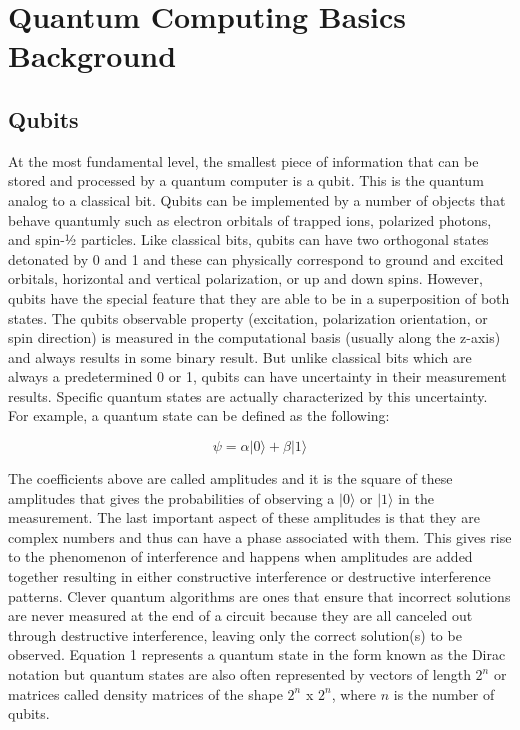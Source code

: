 \documentclass[
	a4paper, %
	10pt, %
	unnumberedsections, %
	twoside, %
]{LTJournalArticle}
\newcommand{\ket}[1]{\lvert#1\rangle} %
\begin{document}
\section{Quantum Computing Basics Background}

\subsection{Qubits}
At the most fundamental level, the smallest piece of information that can be stored and processed by a quantum computer is a qubit. This is the quantum analog to a classical bit. 
Qubits can be implemented by a number of objects that behave quantumly such as electron orbitals of trapped ions, polarized photons, and spin-½ particles. Like classical bits, 
qubits can have two orthogonal states detonated by 0 and 1 and these can physically correspond to ground and excited orbitals, horizontal and vertical polarization, or up and down 
spins. However, qubits have the special feature that they are able to be in a superposition of both states. The qubits observable property (excitation, polarization orientation, or 
spin direction) is measured in the computational basis (usually along the z-axis) and always results in some binary result. But unlike classical bits which are always a predetermined 
0 or 1, qubits can have uncertainty in their measurement results. Specific quantum states are actually characterized by this uncertainty. For example, a quantum state can be defined 
as the following: 

\begin{equation}
	\psi =\alpha\ket{0} + \beta\ket{1}
	\label{eq:quantumstate}
\end{equation}

The coefficients above are called amplitudes and it is the square of these amplitudes that gives the probabilities of observing a $\ket{0}$ or $\ket{1}$ in the measurement. The 
last important aspect of these amplitudes is that they are complex numbers and thus can have a phase associated with them. This gives rise to the phenomenon of interference and 
happens when amplitudes are added together resulting in either constructive interference or destructive interference patterns. Clever quantum algorithms are ones that ensure that 
incorrect solutions are never measured at the end of a circuit because they are all canceled out through destructive interference, leaving only the correct solution(s) to be 
observed. Equation 1 represents a quantum state in the form known as the Dirac notation but quantum states are also often represented by vectors of length $2^n$ or matrices called 
density matrices of the shape $2^n$ x $2^n$, where $n$ is the number of qubits.
\end{document}

